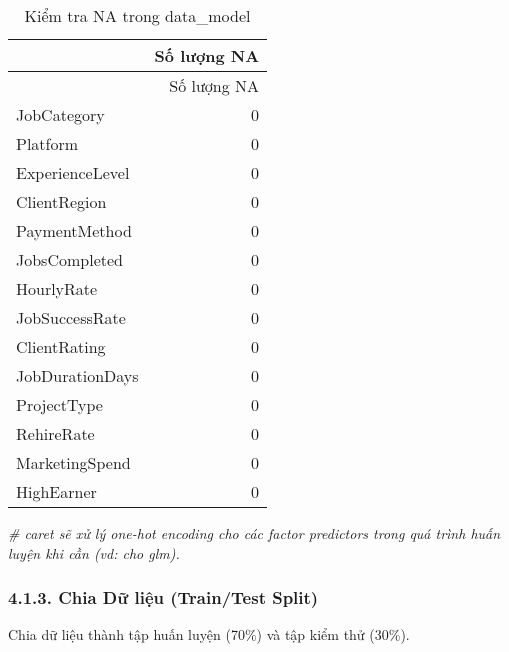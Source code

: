 \documentclass[
]{article}
\newenvironment{Shaded}{\begin{snugshade}}{\end{snugshade}}
\newcommand{\AttributeTok}[1]{\textcolor[rgb]{0.13,0.29,0.53}{#1}}
\newcommand{\CommentTok}[1]{\textcolor[rgb]{0.56,0.35,0.01}{\textit{#1}}}
\newcommand{\ConstantTok}[1]{\textcolor[rgb]{0.56,0.35,0.01}{#1}}
\newcommand{\DecValTok}[1]{\textcolor[rgb]{0.00,0.00,0.81}{#1}}
\newcommand{\FloatTok}[1]{\textcolor[rgb]{0.00,0.00,0.81}{#1}}
\newcommand{\FunctionTok}[1]{\textcolor[rgb]{0.13,0.29,0.53}{\textbf{#1}}}
\newcommand{\NormalTok}[1]{#1}
\newcommand{\OtherTok}[1]{\textcolor[rgb]{0.56,0.35,0.01}{#1}}
\newcommand{\SpecialCharTok}[1]{\textcolor[rgb]{0.81,0.36,0.00}{\textbf{#1}}}
\newcommand{\StringTok}[1]{\textcolor[rgb]{0.31,0.60,0.02}{#1}}
\begin{document}
\begin{longtable}[]{@{}lr@{}}
\caption{Kiểm tra NA trong data\_model}\tabularnewline
\toprule\noalign{}
& Số lượng NA \\
\midrule\noalign{}
\endfirsthead
\toprule\noalign{}
& Số lượng NA \\
\midrule\noalign{}
\endhead
\bottomrule\noalign{}
\endlastfoot
JobCategory & 0 \\
Platform & 0 \\
ExperienceLevel & 0 \\
ClientRegion & 0 \\
PaymentMethod & 0 \\
JobsCompleted & 0 \\
HourlyRate & 0 \\
JobSuccessRate & 0 \\
ClientRating & 0 \\
JobDurationDays & 0 \\
ProjectType & 0 \\
RehireRate & 0 \\
MarketingSpend & 0 \\
HighEarner & 0 \\
\end{longtable}

\begin{Shaded}
\begin{Highlighting}[]
\CommentTok{\# \textasciigrave{}caret\textasciigrave{} sẽ xử lý one{-}hot encoding cho các factor predictors trong quá trình huấn luyện khi cần (vd: cho glm).}
\end{Highlighting}
\end{Shaded}

\subsubsection{4.1.3. Chia Dữ liệu (Train/Test
Split)}\label{chia-dux1eef-liux1ec7u-traintest-split}

Chia dữ liệu thành tập huấn luyện (70\%) và tập kiểm thử (30\%).

\begin{Shaded}
\end{Shaded}
\end{document}
